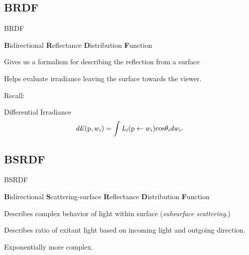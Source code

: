\documentclass[compress,professionalfont]{beamer}
\begin{document}
\subsection{BRDF}
\begin{frame}{BRDF}

    \begin{center}
        {\bf B}idirectional {\bf R}eflectance {\bf D}istribution {\bf F}unction
    \end{center}

    Gives us a formalism for describing the reflection from a surface

    Helps evaluate irradiance leaving the surface towards the viewer.

    Recall:

    \begin{block}{Differential Irradiance}
        \[
            \mathit{dE}(\textup{p}, w_i) = \int\mathit{L_i}(\textup{p} \leftarrow w_i)\textup{cos}\theta_i dw_i.
        \]
    \end{block}
    

\end{frame}




\subsection{BSRDF}
\begin{frame}{BSRDF}

    \begin{center}
        {\bf B}idirectional {\bf S}cattering-surface {\bf R}eflectance {\bf D}istribution {\bf F}unction
    \end{center}

    Describes complex behavior of light within surface (\emph{subsurface scattering}.)

    Describes ratio of exitant light based on incoming light and outgoing direction.

    Exponentially more complex.

\end{frame}
\end{document}
